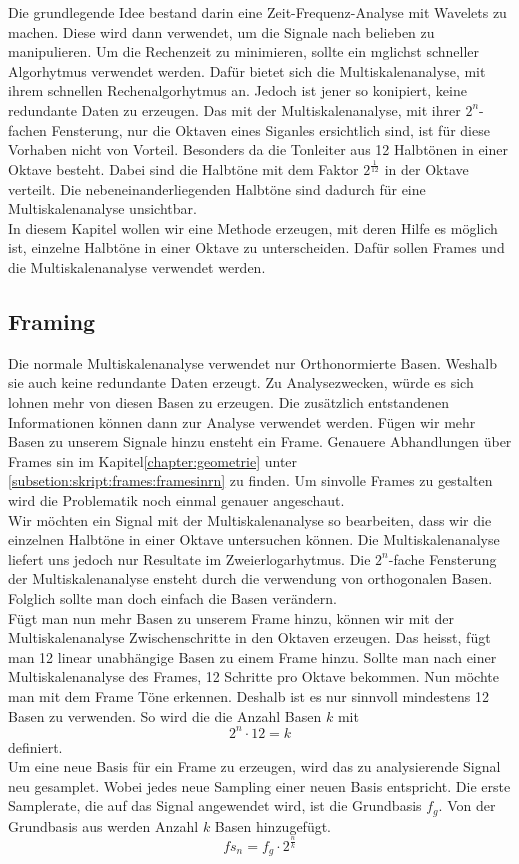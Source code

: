 



Die grundlegende Idee bestand darin eine Zeit-Frequenz-Analyse mit Wavelets zu machen. Diese wird dann verwendet, um die Signale nach belieben zu manipulieren. Um die Rechenzeit zu minimieren, sollte ein mglichst schneller Algorhytmus verwendet werden. Dafür bietet sich die Multiskalenanalyse, mit ihrem schnellen Rechenalgorhytmus an. Jedoch ist jener so konipiert, keine redundante Daten zu erzeugen. Das mit der Multiskalenanalyse, mit ihrer $2^{n}$-fachen Fensterung, nur die Oktaven eines Siganles ersichtlich sind, ist für diese Vorhaben nicht von Vorteil. Besonders da die Tonleiter aus 12 Halbtönen in einer Oktave besteht. Dabei sind die Halbtöne mit dem Faktor $2^{\frac{1}{12}}$ in der Oktave verteilt. Die nebeneinanderliegenden Halbtöne sind dadurch für eine Multiskalenanalyse unsichtbar. \\
In diesem Kapitel wollen wir eine Methode erzeugen, mit deren Hilfe es möglich ist, einzelne Halbtöne in einer Oktave zu unterscheiden. Dafür sollen Frames und die Multiskalenanalyse verwendet werden.




\subsection{Framing}
Die normale Multiskalenanalyse verwendet nur Orthonormierte Basen. Weshalb sie auch keine redundante Daten erzeugt. Zu Analysezwecken, würde es sich lohnen mehr von diesen Basen zu erzeugen. Die zusätzlich entstandenen Informationen können dann zur Analyse verwendet werden. Fügen wir mehr Basen zu unserem Signale hinzu ensteht ein Frame. Genauere Abhandlungen über Frames sin im Kapitel\ref{chapter:geometrie} unter \ref{subsetion:skript:frames:framesinrn} zu finden. Um sinvolle Frames zu gestalten wird die Problematik noch einmal genauer angeschaut.\\

Wir möchten ein Signal mit der Multiskalenanalyse so bearbeiten, dass wir die einzelnen Halbtöne in einer Oktave untersuchen können. Die Multiskalenanalyse liefert uns jedoch nur Resultate im Zweierlogarhytmus. Die $2^{n}$-fache Fensterung der Multiskalenanalyse ensteht durch die verwendung von orthogonalen Basen. Folglich sollte man doch einfach die Basen verändern.\\

Fügt man nun mehr Basen zu unserem Frame hinzu, können wir mit der Multiskalenanalyse Zwischenschritte in den Oktaven erzeugen. Das heisst, fügt man 12 linear unabhängige Basen zu einem Frame hinzu. Sollte man nach einer Multiskalenanalyse des Frames, 12 Schritte pro Oktave bekommen. Nun möchte man mit dem Frame Töne erkennen. Deshalb ist es nur sinnvoll mindestens 12 Basen zu verwenden. So wird die die Anzahl Basen $k$ mit
\[ 2^{n} \cdot 12 = k \]
definiert.\\
Um eine neue Basis für ein Frame zu erzeugen, wird das zu analysierende Signal neu gesamplet. Wobei jedes neue Sampling einer neuen Basis entspricht. Die erste Samplerate, die auf das Signal angewendet wird, ist die Grundbasis $f_{g}$. Von der Grundbasis aus werden Anzahl $k$ Basen hinzugefügt.
\[fs_{n}=f_{g}\cdot2^{\frac{n}{k}}\]

